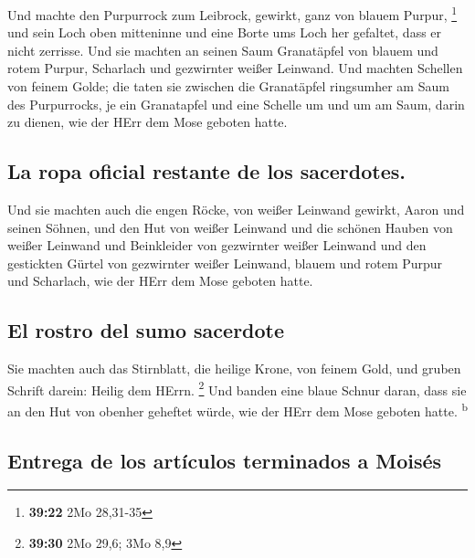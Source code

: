  Und machte den Purpurrock zum Leibrock, gewirkt, ganz
von blauem Purpur, \footnote{\textbf{39:22} 2Mo 28,31-35}
 und sein Loch oben mitteninne und eine Borte ums Loch
her gefaltet, dass er nicht zerrisse.  Und sie machten an
seinen Saum Granatäpfel von blauem und rotem Purpur, Scharlach und
gezwirnter weißer Leinwand.  Und machten Schellen von
feinem Golde; die taten sie zwischen die Granatäpfel ringsumher am Saum
des Purpurrocks,  je ein Granatapfel und eine Schelle um
und um am Saum, darin zu dienen, wie der HErr dem Mose geboten hatte.

\hypertarget{la-ropa-oficial-restante-de-los-sacerdotes.}{%
\subsection{La ropa oficial restante de los
sacerdotes.}\label{la-ropa-oficial-restante-de-los-sacerdotes.}}

 Und sie machten auch die engen Röcke, von weißer
Leinwand gewirkt, Aaron und seinen Söhnen,  und den Hut
von weißer Leinwand und die schönen Hauben von weißer Leinwand und
Beinkleider von gezwirnter weißer Leinwand  und den
gestickten Gürtel von gezwirnter weißer Leinwand, blauem und rotem
Purpur und Scharlach, wie der HErr dem Mose geboten hatte.

\hypertarget{el-rostro-del-sumo-sacerdote}{%
\subsection{El rostro del sumo
sacerdote}\label{el-rostro-del-sumo-sacerdote}}

 Sie machten auch das Stirnblatt, die heilige Krone, von
feinem Gold, und gruben Schrift darein: Heilig dem HErrn. \footnote{\textbf{39:30}
  2Mo 29,6; 3Mo 8,9}  Und banden eine blaue Schnur daran,
dass sie an den Hut von obenher geheftet würde, wie der HErr dem Mose
geboten hatte. \textsuperscript{b}

\hypertarget{entrega-de-los-artuxedculos-terminados-a-moisuxe9s}{%
\subsection{Entrega de los artículos terminados a
Moisés}\label{entrega-de-los-artuxedculos-terminados-a-moisuxe9s}}

